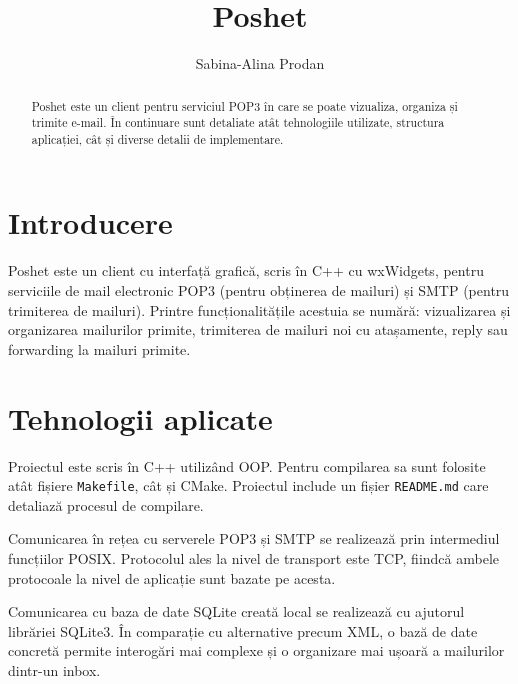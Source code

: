 \documentclass[runningheads]{llncs}
\begin{document}
%
\title{Poshet}
%
%
\author{Sabina-Alina Prodan}
%
%
%
\maketitle              %
%
\begin{abstract}
Poshet este un client pentru serviciul POP3 în care se poate vizualiza, organiza și trimite e-mail. În continuare sunt detaliate atât tehnologiile utilizate, structura aplicației, cât și diverse detalii de implementare.

\end{abstract}
%
%
%
\section{Introducere}

Poshet este un client cu interfață grafică, scris în C++ cu wxWidgets, pentru serviciile de mail electronic POP3 (pentru obținerea de mailuri) și SMTP (pentru trimiterea de mailuri). Printre funcționalitățile acestuia se numără: vizualizarea și organizarea mailurilor primite, trimiterea de mailuri noi cu atașamente, reply sau forwarding la mailuri primite.

\section{Tehnologii aplicate}

Proiectul este scris în C++ utilizând OOP. Pentru compilarea sa sunt folosite atât fișiere \texttt{Makefile}, cât și CMake. Proiectul include un fișier \texttt{README.md} care detaliază procesul de compilare.

Comunicarea în rețea cu serverele POP3 și SMTP se realizează prin intermediul funcțiilor POSIX. Protocolul ales la nivel de transport este TCP, fiindcă ambele protocoale la nivel de aplicație sunt bazate pe acesta.

Comunicarea cu baza de date SQLite creată local se realizează cu ajutorul librăriei SQLite3. În comparație cu alternative precum XML, o bază de date concretă permite interogări mai complexe și o organizare mai ușoară a mailurilor dintr-un inbox.
\end{document}
